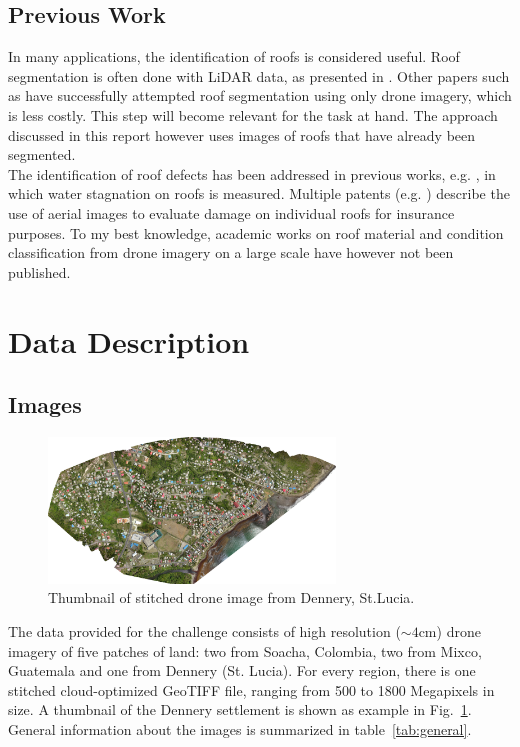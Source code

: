 \documentclass[11pt]{article}
\begin{document}
	\subsection{Previous Work}
	
	In many applications, the identification of roofs is considered useful. Roof segmentation is often done with LiDAR data, as presented in \cite{Chen2012}. Other papers such as \cite{Soman2019} have successfully attempted roof segmentation using only drone imagery, which is less costly. This step will become relevant for the task at hand. The approach discussed in this report however uses images of roofs that have already been segmented.\\
	
	The identification of roof defects has been addressed in previous works, e.g. \cite{Yudin2018}, in which water stagnation on roofs is measured. Multiple patents (e.g. \cite{Shreve2017}) describe the use of aerial images to evaluate damage on individual roofs for insurance purposes. To my best knowledge, academic works on roof material and condition classification from drone imagery on a large scale have however not been published. 
	
	\section{Data Description}
	
	\subsection{Images}
		
	\begin{figure}
		\centering		
		\includegraphics[width=0.68\textwidth]{figures/thumbnail_dennery.png}
		\caption{Thumbnail of stitched drone image from Dennery, St.Lucia.}
		\label{fig:thumbnail_dennery}
	\end{figure}

	The data provided for the challenge consists of high resolution ($\sim4$cm) drone imagery of five patches of land: two from Soacha, Colombia, two from Mixco, Guatemala and one from Dennery (St. Lucia).
	For every region, there is one stitched cloud-optimized GeoTIFF file, ranging from 500 to 1800 Megapixels in size. A thumbnail of the Dennery settlement is shown as example in Fig.~\ref{fig:thumbnail_dennery}.\\
	General information about the images is summarized in table~\ref{tab:general}.
\end{document}
